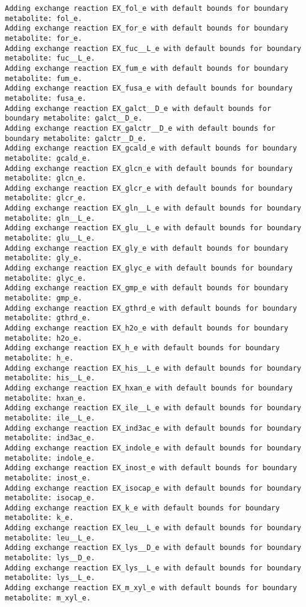 \documentclass[
  letterpaper,
  DIV=11,
  numbers=noendperiod]{scrartcl}
\begin{document}
\begin{verbatim}
Adding exchange reaction EX_fol_e with default bounds for boundary metabolite: fol_e.
Adding exchange reaction EX_for_e with default bounds for boundary metabolite: for_e.
Adding exchange reaction EX_fuc__L_e with default bounds for boundary metabolite: fuc__L_e.
Adding exchange reaction EX_fum_e with default bounds for boundary metabolite: fum_e.
Adding exchange reaction EX_fusa_e with default bounds for boundary metabolite: fusa_e.
Adding exchange reaction EX_galct__D_e with default bounds for boundary metabolite: galct__D_e.
Adding exchange reaction EX_galctr__D_e with default bounds for boundary metabolite: galctr__D_e.
Adding exchange reaction EX_gcald_e with default bounds for boundary metabolite: gcald_e.
Adding exchange reaction EX_glcn_e with default bounds for boundary metabolite: glcn_e.
Adding exchange reaction EX_glcr_e with default bounds for boundary metabolite: glcr_e.
Adding exchange reaction EX_gln__L_e with default bounds for boundary metabolite: gln__L_e.
Adding exchange reaction EX_glu__L_e with default bounds for boundary metabolite: glu__L_e.
Adding exchange reaction EX_gly_e with default bounds for boundary metabolite: gly_e.
Adding exchange reaction EX_glyc_e with default bounds for boundary metabolite: glyc_e.
Adding exchange reaction EX_gmp_e with default bounds for boundary metabolite: gmp_e.
Adding exchange reaction EX_gthrd_e with default bounds for boundary metabolite: gthrd_e.
Adding exchange reaction EX_h2o_e with default bounds for boundary metabolite: h2o_e.
Adding exchange reaction EX_h_e with default bounds for boundary metabolite: h_e.
Adding exchange reaction EX_his__L_e with default bounds for boundary metabolite: his__L_e.
Adding exchange reaction EX_hxan_e with default bounds for boundary metabolite: hxan_e.
Adding exchange reaction EX_ile__L_e with default bounds for boundary metabolite: ile__L_e.
Adding exchange reaction EX_ind3ac_e with default bounds for boundary metabolite: ind3ac_e.
Adding exchange reaction EX_indole_e with default bounds for boundary metabolite: indole_e.
Adding exchange reaction EX_inost_e with default bounds for boundary metabolite: inost_e.
Adding exchange reaction EX_isocap_e with default bounds for boundary metabolite: isocap_e.
Adding exchange reaction EX_k_e with default bounds for boundary metabolite: k_e.
Adding exchange reaction EX_leu__L_e with default bounds for boundary metabolite: leu__L_e.
Adding exchange reaction EX_lys__D_e with default bounds for boundary metabolite: lys__D_e.
Adding exchange reaction EX_lys__L_e with default bounds for boundary metabolite: lys__L_e.
Adding exchange reaction EX_m_xyl_e with default bounds for boundary metabolite: m_xyl_e.

\end{verbatim}
\end{document}
